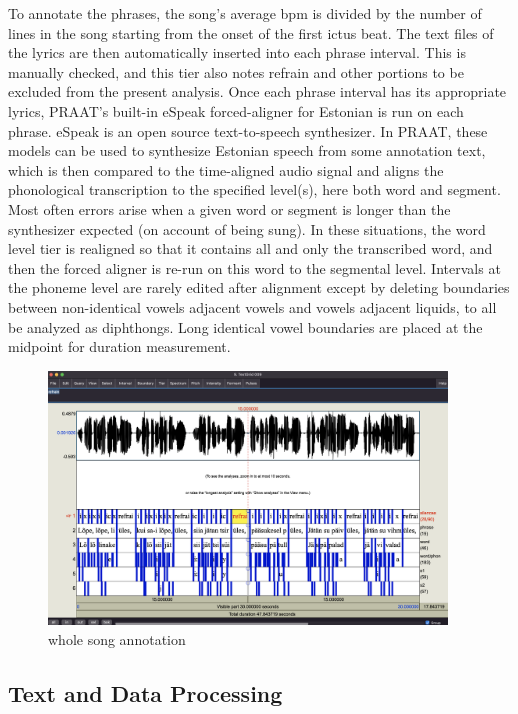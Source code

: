 \documentclass[12pt]{article}
\begin{document}
To annotate the phrases, the song's average bpm is divided by the number of lines in the song starting from the onset of the first ictus beat. The text files of the lyrics are then automatically inserted into each phrase interval. This is manually checked, and this tier also notes refrain and other portions to be excluded from the present analysis. Once each phrase interval has its appropriate lyrics, PRAAT's built-in eSpeak forced-aligner for Estonian is run on each phrase. eSpeak \cite{ESpeakSpeechSynthesizer} is an open source text-to-speech synthesizer. In PRAAT, these models can be used to synthesize Estonian speech from some annotation text, which is then  compared to the time-aligned audio signal and aligns the phonological transcription to the specified level(s), here both word and segment. Most often errors arise when a given word or segment is longer than the synthesizer expected (on account of being sung). In these situations, the word level tier is realigned so that it contains all and only the transcribed word, and then the forced aligner is re-run on this word to the segmental level. Intervals at the phoneme level are rarely edited after alignment except by deleting boundaries between non-identical vowels adjacent vowels  and vowels adjacent liquids, to all be analyzed as diphthongs. Long identical vowel boundaries are placed at the midpoint for duration measurement. 

\begin{figure}[htbp]
		\begin{center}
			\includegraphics[width=300pt]{figures/big_grid.png}
			
			\caption{whole song annotation}
			\label{song_whole}
		\end{center}
\end{figure}
	
\subsection*{Text and Data Processing}
\end{document}
